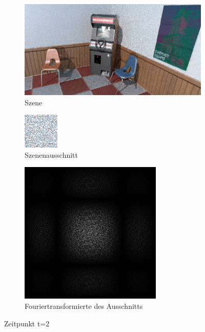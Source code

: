 \begin{figure}[H]
    \begin{subfigure}{\textwidth}
        \centering \includegraphics[scale=.25]{content/TemporalerAlg/Bilder/Sorting/Screenshots/seed_debug_4.0_selection.png}
        \caption{Szene}
        \label{fig:Nur_Sorting_Szene_t2}
    \end{subfigure}
    \begin{subfigure}{0.5\textwidth}
        \centering\includegraphics[width=0.4\linewidth]{content/TemporalerAlg/Bilder/Sorting/Screenshots/seed_debug_4.0_ausschnitt.png} 
        \caption{Szenenausschnitt}
        \label{fig:Nur_Sorting_ausschnitt_t2}
    \end{subfigure}
    \begin{subfigure}{0.5\textwidth}
        \centering\includegraphics[width=0.4\linewidth]{content/TemporalerAlg/Bilder/Sorting/Screenshots/Spektren/seed_debug_4.0_ausschnitt.png}
        \caption{Fouriertransformierte des Ausschnitts}
        \label{fig:Nur_Sorting_Fouriertransformierte_t2}
    \end{subfigure}
        \caption{Zeitpunkt t=2}
        \label{fig:Nur_Sorting_Verlauf_t2}
\end{figure}

